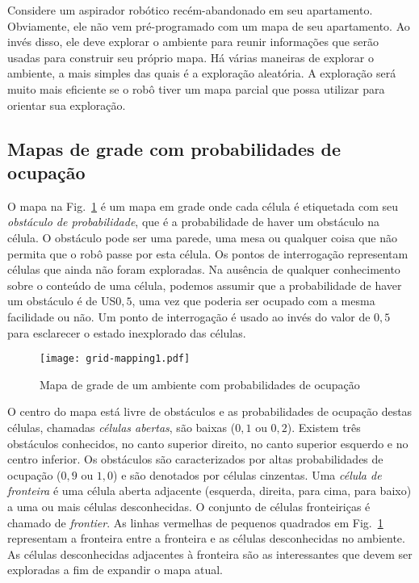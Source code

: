 Considere um aspirador robótico recém-abandonado em seu apartamento. Obviamente, ele não vem pré-programado com um mapa de seu apartamento. Ao invés disso, ele deve explorar o ambiente para reunir informações que serão usadas para construir seu próprio mapa. Há várias maneiras de explorar o ambiente, a mais simples das quais é a exploração aleatória. A exploração será muito mais eficiente se o robô tiver um mapa parcial que possa utilizar para orientar sua exploração.

\subsection{Mapas de grade com probabilidades de ocupação}

O mapa na Fig.~\ref{fig.map-explore} é um mapa em grade onde cada célula é etiquetada com seu \emph{obstáculo de probabilidade}, que é a probabilidade de haver um obstáculo na célula. O obstáculo pode ser uma parede, uma mesa ou qualquer coisa que não permita que o robô passe por esta célula. Os pontos de interrogação representam células que ainda não foram exploradas. Na ausência de qualquer conhecimento sobre o conteúdo de uma célula, podemos assumir que a probabilidade de haver um obstáculo é de US$ 0,5$, uma vez que poderia ser ocupado com a mesma facilidade ou não. Um ponto de interrogação é usado ao invés do valor de $0,5$ para esclarecer o estado inexplorado das células.

\begin{figure}
\begin{center}
\texttt{[image: grid-mapping1.pdf]}
\end{center}
\caption{Mapa de grade de um ambiente com probabilidades de ocupação}\label{fig.map-explore}
\end{figure}

O centro do mapa está livre de obstáculos e as probabilidades de ocupação destas células, chamadas \emph{células abertas}, são baixas ($0,1$ ou $0,2$). Existem três obstáculos conhecidos, no canto superior direito, no canto superior esquerdo e no centro inferior. Os obstáculos são caracterizados por altas probabilidades de ocupação ($0,9$ ou $1,0$) e são denotados por células cinzentas. Uma \emph{célula de fronteira} é uma célula aberta adjacente (esquerda, direita, para cima, para baixo) a uma ou mais células desconhecidas. O conjunto de células fronteiriças é chamado de \emph{frontier}. As linhas vermelhas de pequenos quadrados em Fig.~\ref{fig.map-explore} representam a fronteira entre a fronteira e as células desconhecidas no ambiente. As células desconhecidas adjacentes à fronteira são as interessantes que devem ser exploradas a fim de expandir o mapa atual.

